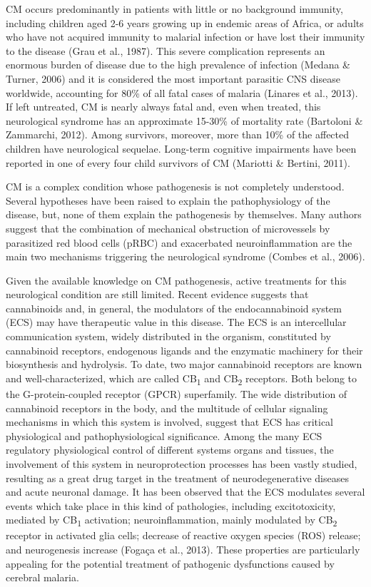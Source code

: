 \documentclass[empirical, authordate, issue]{jote-new-article}
\begin{document}
CM occurs predominantly in patients with little or no background immunity, including children aged 2-6 years growing up in endemic areas of Africa, or adults who have not acquired immunity to malarial infection or have lost their immunity to the disease (Grau et al., 1987). This severe complication represents an enormous burden of disease due to the high prevalence of infection (Medana \& Turner,
2006) and it is considered the most important parasitic CNS disease worldwide, accounting for 80\% of all fatal cases of malaria  (Linares et al., 2013). If left untreated, CM is nearly always fatal and, even when treated, this neurological syndrome has an approximate 15-30\% of mortality rate (Bartoloni \& Zammarchi, 2012). Among survivors, moreover, more than 10\% of the affected children have neurological sequelae. Long-term cognitive impairments have been reported in one of every four child survivors of CM  (Mariotti \& Bertini, 2011).

CM is a complex condition whose pathogenesis is not completely understood. Several hypotheses have been raised to explain the pathophysiology of the disease, but, none of them explain the pathogenesis by themselves. Many authors suggest that the combination of mechanical obstruction of microvessels by parasitized red blood cells (pRBC) and exacerbated neuroinflammation are the main two mechanisms triggering the neurological syndrome (Combes et al., 2006).

Given the available knowledge on CM pathogenesis, active treatments for this neurological condition are still limited. Recent evidence suggests that cannabinoids and, in general, the modulators of the endocannabinoid system (ECS) may have therapeutic value in this disease. The ECS is an intercellular communication system, widely distributed in the organism, constituted by cannabinoid receptors, endogenous ligands and the enzymatic machinery for their biosynthesis and hydrolysis. To date, two major cannabinoid receptors are known and well-characterized, which are called CB\textsubscript{1} and CB\textsubscript{2} receptors. Both belong to the G-protein-coupled receptor (GPCR) superfamily. The wide distribution of cannabinoid receptors in the body, and the multitude of cellular signaling mechanisms in which this system is involved, suggest that ECS has critical physiological and pathophysiological significance. Among the many ECS regulatory physiological control of different systems organs and tissues, the involvement of this system in neuroprotection processes has been vastly studied, resulting as a great drug target in the treatment of neurodegenerative diseases and acute neuronal damage. It has been observed that the ECS modulates several events which take place in this kind of pathologies, including excitotoxicity, mediated by CB\textsubscript{1} activation; neuroinflammation, mainly modulated by CB\textsubscript{2} receptor in activated glia cells; decrease of reactive oxygen species (ROS) release; and neurogenesis increase (Fogaça et al., 2013). These properties are particularly appealing for the potential treatment of pathogenic dysfunctions caused by cerebral malaria.
\end{document}
